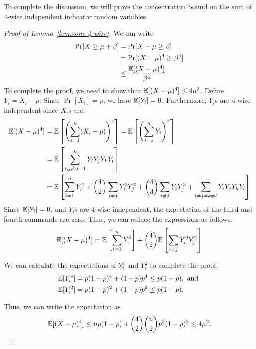To complete the discussion, we will prove the concentration bound on the sum of
$4$-wise independent indicator random variables.

\begin{proof}
  [Proof of Lemma~\ref{lem:conc-4-wise}]
  We can write
  \begin{align*}
    \Pr[X \geq \mu + \beta] &= \Pr[X - \mu \geq \beta] \\
                            &= \Pr[(X-\mu)^4 \geq \beta^4]\\
                            &\leq \frac{\mathbb{E}[(X-\mu)^4]}{\beta^4}
  \end{align*}
  To complete the proof, we need to show that $\mathbb{E}[(X-\mu)^4] \leq
  4\mu^2$. Define $Y_i = X_i - p$. Since $\Pr[X_i] = p$, we have $\mathbb{E}[Y_i] =
  0$. Furthermore, $Y_i$s are $4$-wise independent since $X_i$s are.
  \begin{align*}
    \mathbb{E}[(X-\mu)^4] &= \mathbb{E}\left[ \left( \sum_{i=1}^n (X_i - p) \right)^4  \right] = \mathbb{E}\left[ \left( \sum_{i=1}^n Y_i \right)^4 \right]\\
                  &= \mathbb{E} \left[ \sum_{i,j,k,l = 1}^n Y_iY_jY_kY_l \right]\\
                  &= \mathbb{E}\left[ \sum_{i=1}^n Y_i^4 +  \binom{4}{2}\sum_{i\neq j}Y_i^2Y_j^2 + \binom{4}{3}\sum_{i\neq j}Y_iY_j^3 + \sum_{i\neq j\neq k\neq l}Y_iY_jY_kY_l \right]
  \end{align*}
  Since $\mathbb{E}[Y_i] = 0$, and $Y_i$s are $4$-wise independent, the expectation of
  the third and fourth summands are zero. Thus, we can reduce the expressions as
  follows.
  \begin{align*}
    \mathbb{E}[(X-\mu)^4] = \mathbb{E}\left[ \sum_{i=1}^n Y_i^4 \right] + \binom{4}{2}\mathbb{E}\left[ \sum_{i\neq j}Y_i^2 Y_j^2 \right]
  \end{align*}

  We can calculate the expectations of $Y_i^4$ and $Y_i^2$ to complete the proof.
  \begin{align*}
    \mathbb{E}[Y_i^4] &= p(1-p)^4 + (1-p)p^4 \leq p(1-p), \text{ and }\\
    \mathbb{E}[Y_i^2] &= p(1-p)^2 + (1-p)p^2 \leq p(1-p).
  \end{align*}

  Thus, we can write the expectation as
  \begin{align*}
    \mathbb{E}[(X-\mu)^4] \leq np(1-p) + \binom{4}{2}\binom{n}{2}p^2(1-p)^2 \leq 4\mu^2.
  \end{align*}
\end{proof}

